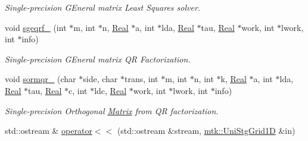 \begin{DoxyCompactItemize}
\begin{DoxyCompactList}\small\item\em Single-\/precision G\-Eneral matrix Least Squares solver. \end{DoxyCompactList}\item 
void \hyperlink{namespacemtk_aece7419193d8ab43e186c97ad6d529fb}{sgeqrf\-\_\-} (int $\ast$m, int $\ast$n, \hyperlink{group__c01-roots_gac080bbbf5cbb5502c9f00405f894857d}{Real} $\ast$a, int $\ast$lda, \hyperlink{group__c01-roots_gac080bbbf5cbb5502c9f00405f894857d}{Real} $\ast$tau, \hyperlink{group__c01-roots_gac080bbbf5cbb5502c9f00405f894857d}{Real} $\ast$work, int $\ast$lwork, int $\ast$info)
\begin{DoxyCompactList}\small\item\em Single-\/precision G\-Eneral matrix Q\-R Factorization. \end{DoxyCompactList}\item 
void \hyperlink{namespacemtk_a59c58408e1c0a9837b67a417be986b82}{sormqr\-\_\-} (char $\ast$side, char $\ast$trans, int $\ast$m, int $\ast$n, int $\ast$k, \hyperlink{group__c01-roots_gac080bbbf5cbb5502c9f00405f894857d}{Real} $\ast$a, int $\ast$lda, \hyperlink{group__c01-roots_gac080bbbf5cbb5502c9f00405f894857d}{Real} $\ast$tau, \hyperlink{group__c01-roots_gac080bbbf5cbb5502c9f00405f894857d}{Real} $\ast$c, int $\ast$ldc, \hyperlink{group__c01-roots_gac080bbbf5cbb5502c9f00405f894857d}{Real} $\ast$work, int $\ast$lwork, int $\ast$info)
\begin{DoxyCompactList}\small\item\em Single-\/precision Orthogonal \hyperlink{classmtk_1_1Matrix}{Matrix} from Q\-R factorization. \end{DoxyCompactList}\item 
std\-::ostream \& \hyperlink{namespacemtk_a97f79d150b3b5c7b76d4fcc2271f972b}{operator$<$$<$} (std\-::ostream \&stream, \hyperlink{classmtk_1_1UniStgGrid1D}{mtk\-::\-Uni\-Stg\-Grid1\-D} \&in)
\end{DoxyCompactItemize}
